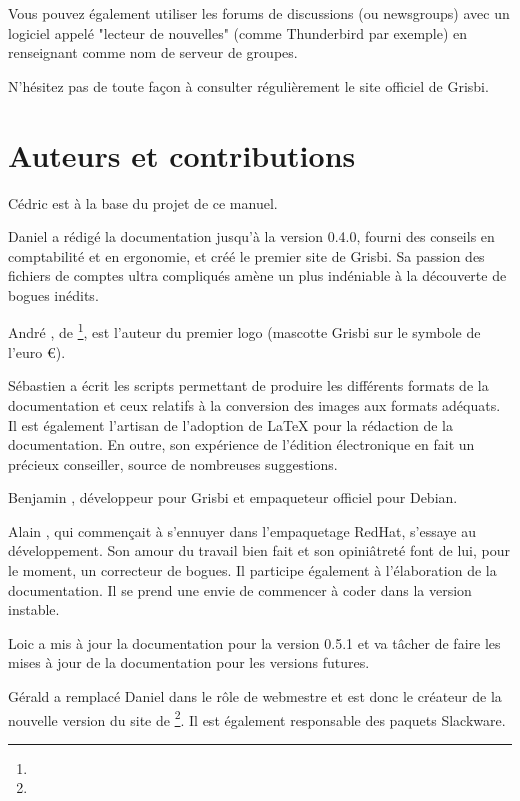 Vous pouvez également utiliser les forums de discussions (ou newsgroups) avec un logiciel appelé "lecteur de nouvelles" (comme Thunderbird par exemple) en renseignant  comme nom de serveur de groupes.

N'hésitez pas de toute façon à consulter régulièrement le site officiel de Grisbi.



\section{Auteurs et contributions\label{introduction-authors}}		%


Cédric  est à la base du projet de ce manuel.

Daniel  a rédigé la documentation jusqu'à la version 0.4.0, fourni des conseils en comptabilité et en ergonomie, et créé le premier site de Grisbi. Sa passion des fichiers de comptes ultra compliqués amène un plus indéniable à la découverte de bogues inédits.

André , de \footnote{\urlLinuxGraphic{}}, est l'auteur du premier logo (mascotte Grisbi sur le symbole de l'euro €).

Sébastien  a écrit les scripts permettant de produire les différents formats de la documentation et ceux relatifs à la conversion des images aux formats adéquats. Il est également l'artisan de l'adoption de \gls{LaTeX} pour la rédaction de la documentation. En outre, son expérience de l'édition électronique en fait un précieux conseiller, source de nombreuses suggestions.

Benjamin , développeur pour Grisbi et empaqueteur officiel pour \gls{Debian}.

Alain , qui commençait à s'ennuyer dans l'empaquetage \gls{RedHat}, s'essaye au développement. Son amour du travail bien fait et son opiniâtreté font de lui, pour le moment, un correcteur de bogues. Il participe également à l'élaboration de la documentation. Il se prend une envie de commencer à coder dans la version instable.

Loic  a mis à jour la documentation pour la version 0.5.1 et va tâcher de faire les mises à jour de la documentation pour les versions futures.

Gérald  a remplacé Daniel  dans le rôle de webmestre et est donc le créateur de la nouvelle version du site de \footnote{\urlGrisbi{}}. Il est également responsable des paquets \gls{Slackware}.

